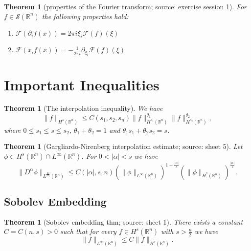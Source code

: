 \documentclass[12pt,a4paper]{article}
\newtheorem{thm}[definition]{Theorem}
\newcommand{\Rn}{\mathbb{R}^n}
\begin{document}
\begin{thm}[properties of the Fourier transform; source: exercise session 1]
For $f\in \mathcal{S}(\mathbb{R}^n)$ the following properties hold:
\begin{enumerate}
\item $\mathcal{F}(\partial_if(x))=2\pi i \xi_i \mathcal{F}(f)(\xi)$ 
\item $\mathcal{F}(x_if(x))=-\frac{1}{2\pi i} \partial_{\xi_i} \mathcal{F}(f)(\xi)$
\end{enumerate}
\end{thm}

\section{Important Inequalities}

\begin{thm}[The interpolation inequality]
We have
\begin{equation}
\lVert f \rVert_{H^s(\Rn)} \leq C(s_1,s_2,s_n)\lVert f \rVert_{H^{s_1}(\Rn)}^{\theta_1} \lVert f \rVert_{H^{s_2}(\Rn)}^{\theta_2},
\end{equation}
where $0\leq s_1\leq s \leq s_2$, $\theta_1+\theta_2=1$ and $\theta_1s_1+\theta_2s_2=s$.
\end{thm}

\begin{thm}[Gargliardo-Nirenberg interpolation estimate; source: sheet 5]
Let $\phi \in H^s(\Rn)\cap L^{\infty}(\Rn)$. For $0<\vert \alpha \vert < s$ we have
\begin{equation}
\lVert D^{\alpha} \phi \rVert_{L^{\frac{2s}{\vert \alpha \vert}}(\Rn)} \leq C(\vert \alpha \vert,s,n)(\lVert \phi \rVert_{L^{\infty}(\Rn)})^{1-\frac{\vert \alpha \vert}{s}}(\lVert \phi \rVert _{\dot H^s(\Rn)})^{\frac{\vert \alpha \vert}{s}}.
\end{equation}
\end{thm}

\subsection{Sobolev Embedding}

\begin{thm}[Sobolev embedding thm; source: sheet 1]
There exists a constant $C=C(n,s)>0$ such that for every $f\in H^s(\mathbb{R}^n)$ with $s>\frac{n}{2}$ we have
\begin{equation}
\lVert f \rVert_{L^{\infty}(\mathbb{R}^n)} \leq C \lVert f \rVert _{H^s(\mathbb{R}^n)}.
\end{equation}
\end{thm}
\end{document}
